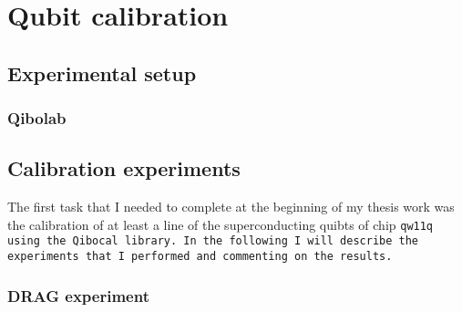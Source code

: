 \chapter{Qubit calibration}

\section{Experimental setup}

\subsection{Qibolab}

\section{Calibration experiments}

The first task that I needed to complete at the beginning of my thesis work was the calibration of at least a line of the superconducting quibts of chip \tt{qw11q} using the \tt{Qibocal} library.
In the following I will describe the experiments that I performed and commenting on the results.

\subsection{DRAG experiment}\label{sec:DRAG}
\cite{Motzoi_2009}\cite{Gambetta_2011}

